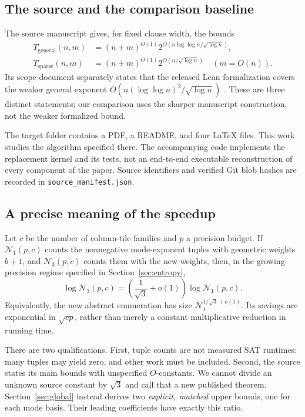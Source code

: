 \documentclass[11pt]{article}
\theoremstyle{remark}
\begin{document}
\subsection{The source and the comparison baseline}

The source manuscript gives, for fixed clause width, the bounds
\begin{align}
 T_{\mathrm{general}}(n,m)&=(n+m)^{O(1)}
       2^{O(n\log\log n/\sqrt{\log n})},\label{eq:baseline-dense}\\
 T_{\mathrm{sparse}}(n,m)&=(n+m)^{O(1)}
       2^{O(n/\sqrt{\log n})}\quad(m=O(n)).\label{eq:baseline-sparse}
\end{align}
Its scope document separately states that the released Lean formalization covers the weaker general exponent $O(n(\log\log n)^2/\sqrt{\log n})$ \cite{paper,scope}. These are three distinct statements; our comparison uses the sharper manuscript construction, not the weaker formalized bound.

The target folder contains a PDF, a README, and four LaTeX files. This work studies the algorithm specified there. The accompanying code implements the replacement kernel and its tests, not an end-to-end executable reconstruction of every component of the paper. Source identifiers and verified Git blob hashes are recorded in \texttt{source\_manifest.json}.

\subsection{A precise meaning of the speedup}

Let $c$ be the number of column-tile families and $p$ a precision budget. If $\mathcal N_1(p,c)$ counts the nonnegative mode-exponent tuples with geometric weights $b+1$, and $\mathcal N_3(p,c)$ counts them with the new weights, then, in the growing-precision regime specified in Section~\ref{sec:entropy},
\begin{equation}\label{eq:headline-entropy}
 \log\mathcal N_3(p,c)
 =\left(\frac1{\sqrt3}+o(1)\right)\log\mathcal N_1(p,c).
\end{equation}
Equivalently, the new abstract enumeration has size $\mathcal N_1^{1/\sqrt3+o(1)}$. Its savings are exponential in $\sqrt{cp}$, rather than merely a constant multiplicative reduction in running time.

There are two qualifications. First, tuple counts are not measured SAT runtimes: many tuples may yield zero, and other work must be included. Second, the source states its main bounds with unspecified $O$-constants. We cannot divide an unknown source constant by $\sqrt3$ and call that a new published theorem. Section~\ref{sec:global} instead derives two \emph{explicit, matched} upper bounds, one for each mode basis. Their leading coefficients have exactly this ratio.
\end{document}
